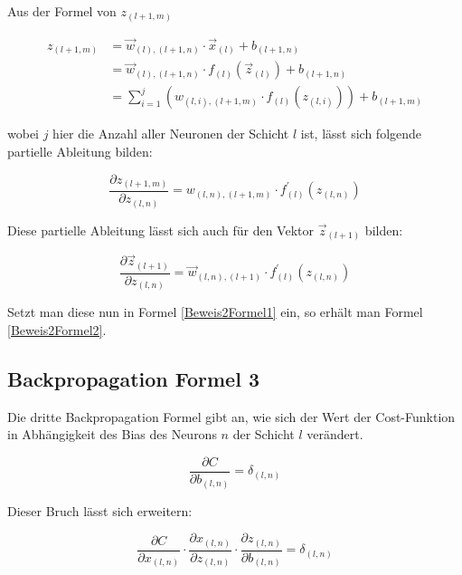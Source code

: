 \documentclass[
	a4paper,
	12pt,
	ngerman,
	oneside
]{scrreprt}											%
\begin{document}
				Aus der Formel von $z_{(l+1,m)}$
				
				\begin{equation}
					\begin{split}
						z_{(l+1,m)} & = \vec{w}_{(l),(l+1,n)} \cdot \vec{x}_{(l)} + b_{(l+1,n)} \\
						&= \vec{w}_{(l),(l+1,n)} \cdot f_{(l)}(\vec{z}_{(l)}) + b_{(l+1,n)} \\
						&= \sum_{i=1}^{j}(w_{(l,i),(l+1,m)} \cdot f_{(l)}(z_{(l,i)})) + b_{(l+1,m)}
					\end{split}
				\end{equation}
				
				wobei $j$ hier die Anzahl aller Neuronen der Schicht $l$ ist, lässt sich folgende partielle Ableitung bilden:
				
				\begin{equation}
					\frac{\partial z_{(l+1,m)}}{\partial z_{(l,n)}} = w_{(l,n),(l+1,m)} \cdot f_{(l)}^{\prime} (z_{(l,n)})
				\end{equation}
				
				Diese partielle Ableitung lässt sich auch für den Vektor $\vec{z}_{(l+1)}$ bilden:
				
				\begin{equation}
					\frac{\partial \vec{z}_{(l+1)}}{\partial z_{(l,n)}} = \vec{w}_{(l,n),(l+1)} \cdot f_{(l)}^{\prime}(z_{(l,n)})
				\end{equation}
				
				Setzt man diese nun in Formel \ref{Beweis2Formel1} ein, so erhält man Formel \ref{Beweis2Formel2}.
				
	
	
			\subsection*{Backpropagation Formel 3}
				Die dritte Backpropagation Formel gibt an, wie sich der Wert der Cost-Funktion in Abhängigkeit des Bias des Neurons $n$ der Schicht $l$ verändert.
	
				\begin{equation}\label{Beweis3Formel1}
					\frac{\partial C}{\partial b_{(l,n)}} = \delta_{(l,n)}
				\end{equation}
				
				Dieser Bruch lässt sich erweitern:
				
				\begin{equation}
					\frac{\partial C}{\partial x_{(l,n)}} \cdot \frac{\partial x_{(l,n)}}{\partial z_{(l,n)}} \cdot \frac{\partial z_{(l,n)}}{\partial b_{(l,n)}} = \delta_{(l,n)}
				\end{equation}
				
\end{document}

